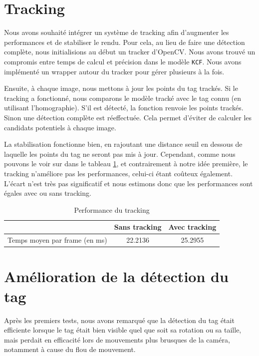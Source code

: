     \section{Tracking}
        Nous avons souhaité intégrer un système de tracking afin d'augmenter les performances et de stabiliser le rendu. Pour cela, au lieu de faire une détection complète, nous initialisions au début un tracker d'OpenCV. Nous avons trouvé un compromis entre temps de calcul et précision dans le modèle \verb|KCF|. Nous avons implémenté un wrapper autour du tracker pour gérer plusieurs à la fois. 

        Ensuite, à chaque image, nous mettons à jour les points du tag trackés. Si le tracking a fonctionné, nous comparons le modèle tracké avec le tag connu (en utilisant l'homographie). S'il est détecté, la fonction renvoie les points trackés. Sinon une détection complète est réeffectuée. Cela permet d'éviter de calculer les candidats potentiels à chaque image.

        La stabilisation fonctionne bien, en rajoutant une distance seuil en dessous de laquelle les points du tag ne seront pas mis à jour. Cependant, comme nous pouvons le voir sur dans le tableau \ref{table:tracking}, et contrairement à notre idée première, le tracking n'améliore pas les performances, celui-ci étant coûteux également. L'écart n'est très pas significatif et nous estimons donc que les performances sont égales avec ou sans tracking.

        \begin{table}[!h]
            \begin{center}
                \begin{tabular}{c|c|c}
                 & Sans tracking & Avec tracking \\ \hline
                Temps moyen par frame (en ms) & 22.2136 & 25.2955 \\ 
                \end{tabular}
            \end{center}
            \caption{Performance du tracking}
            \label{table:tracking}
        \end{table}
    
    \section{Amélioration de la détection du tag}

    Après les premiers tests, nous avons remarqué que la détection du tag était efficiente lorsque le tag était bien visible quel que soit sa rotation ou sa taille, mais perdait en efficacité lors de mouvements plus brusques de la caméra, notamment à cause du flou de mouvement.

